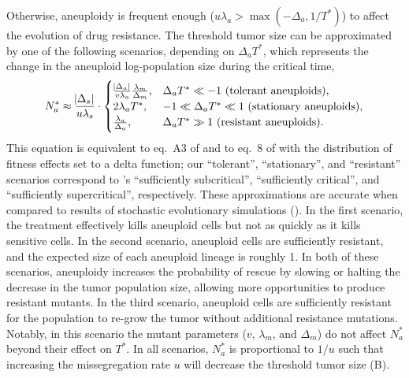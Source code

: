 \documentclass[12pt]{extarticle}
\begin{document}
Otherwise, aneuploidy is frequent enough ($u\lambda_a > \max{\left(-\Delta_a, 1/T^*\right)}$) to affect the evolution of drug resistance. 
The threshold tumor size can be approximated by one of the following scenarios, depending on $\Delta_a T^*$, which represents the change in the aneuploid log-population size during the critical time,
\begin{equation}  \label{eq:N_a}
\begin{aligned}
N_a^* \approx 
  \frac{\abs{\Delta_s}}{u\lambda_s} \cdot \begin{cases}
    \frac{\abs{\Delta_a}}{v\lambda_a}  \frac{\lambda_m}{\Delta_m} ,&
  \Delta_a T^* \ll -1 \text{ (tolerant aneuploids)},\\ 
  2\lambda_a T^* ,&
  -1 \ll \Delta_a T^* \ll 1  \text{ (stationary aneuploids)},\\ 
  \frac{\lambda_a}{\Delta_a} ,&
   \Delta_a T^* \gg 1 \text{ (resistant aneuploids)}.
  \end{cases}
\end{aligned}
\end{equation}
This equation is equivalent to eq.~A3 of \citet{iwasa2004evolutionary} and to eq.~8 of \citet{osmond_genetic_2020} with the distribution of fitness effects set to a delta function;
our ``tolerant'', ``stationary'', and ``resistant'' scenarios correspond to \citet{osmond_genetic_2020}'s ``sufficiently subcritical'', ``sufficiently critical'', and ``sufficiently supercritical'', respectively. %
These approximations are accurate when compared to results of stochastic evolutionary simulations (). 
In the first scenario, the treatment effectively kills aneuploid cells but not as quickly as it kills sensitive cells. 
In the second scenario, aneuploid cells are sufficiently resistant, and the expected size of each aneuploid lineage is roughly 1.
In both of these scenarios, aneuploidy increases the probability of rescue by slowing or halting the decrease in the tumor population size, allowing more opportunities to produce resistant mutants. 
In the third scenario, aneuploid cells are sufficiently resistant for the population to re-grow the tumor without additional resistance mutations.
Notably, in this scenario the mutant parameters ($v$, $\lambda_m$, and $\Delta_m$) do not affect $N_a^*$ beyond their effect on $T^*$.
In all scenarios, $N_a^*$ is proportional to $1/u$ such that increasing the missegregation rate $u$ will decrease the threshold tumor size (B).
\end{document}

